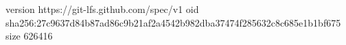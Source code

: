 version https://git-lfs.github.com/spec/v1
oid sha256:27c9637d84b87ad86c9b21af2a4542b982dba37474f285632c8c685e1b1bf675
size 626416
